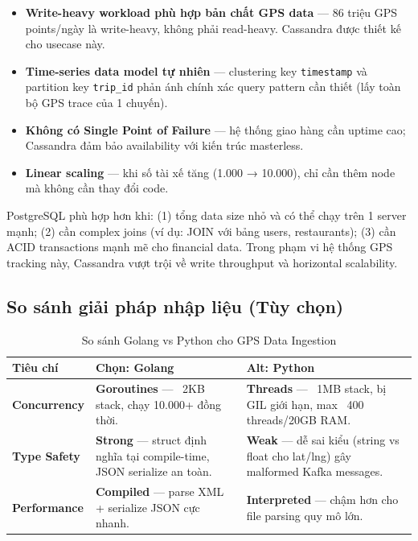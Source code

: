\begin{itemize}
    \item \textbf{Write-heavy workload phù hợp bản chất GPS data} — 86 triệu GPS points/ngày là write-heavy, không phải read-heavy. Cassandra được thiết kế cho usecase này.
    \item \textbf{Time-series data model tự nhiên} — clustering key \texttt{timestamp} và partition key \texttt{trip\_id} phản ánh chính xác query pattern cần thiết (lấy toàn bộ GPS trace của 1 chuyến).
    \item \textbf{Không có Single Point of Failure} — hệ thống giao hàng cần uptime cao; Cassandra đảm bảo availability với kiến trúc masterless.
    \item \textbf{Linear scaling} — khi số tài xế tăng (1.000 → 10.000), chỉ cần thêm node mà không cần thay đổi code.
\end{itemize}

PostgreSQL phù hợp hơn khi: (1) tổng data size nhỏ và có thể chạy trên 1 server mạnh; (2) cần complex joins (ví dụ: JOIN với bảng users, restaurants); (3) cần ACID transactions mạnh mẽ cho financial data. Trong phạm vi hệ thống GPS tracking này, Cassandra vượt trội về write throughput và horizontal scalability.

\subsection{So sánh giải pháp nhập liệu (Tùy chọn)}
\label{sec:ingestion-comparison}

\bigskip
\begin{table}[H]
\centering
\caption[So sánh Golang vs Python cho Ingestion Layer]{So sánh Golang vs Python cho GPS Data Ingestion}
\label{tab:ingestion-comparison}
\begin{tabular}{|p{3cm}|p{5cm}|p{5cm}|}
\hline
\textbf{Tiêu chí} & \textbf{Chọn: Golang} & \textbf{Alt: Python} \\
\hline
\textbf{Concurrency} &
\textbf{Goroutines} — ~2KB stack, chạy 10.000+ đồng thời. &
\textbf{Threads} — ~1MB stack, bị GIL giới hạn, max ~400 threads/20GB RAM. \\
\hline
\textbf{Type Safety} &
\textbf{Strong} — struct định nghĩa tại compile-time, JSON serialize an toàn. &
\textbf{Weak} — dễ sai kiểu (string vs float cho lat/lng) gây malformed Kafka messages. \\
\hline
\textbf{Performance} &
\textbf{Compiled} — parse XML + serialize JSON cực nhanh. &
\textbf{Interpreted} — chậm hơn cho file parsing quy mô lớn. \\
\hline
\end{tabular}
\end{table}
